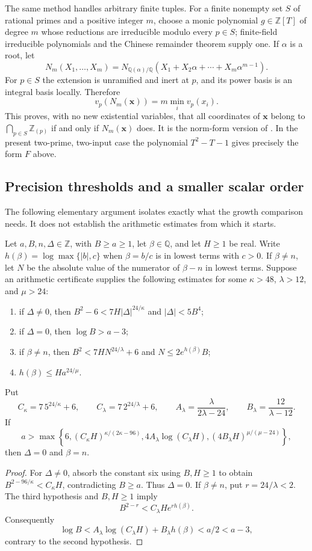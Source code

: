 The same method handles arbitrary finite tuples. For a finite nonempty
set $S$ of rational primes and a positive integer $m$, choose a monic
polynomial $g\in\mathbb Z[T]$ of degree $m$ whose reductions are
irreducible modulo every $p\in S$; finite-field irreducible polynomials
and the Chinese remainder theorem supply one. If $\alpha$ is a root, let
\[
 N_m(X_1,\ldots,X_m)=
 N_{\mathbb Q(\alpha)/\mathbb Q}
 (X_1+X_2\alpha+\cdots+X_m\alpha^{m-1}).
\]
For $p\in S$ the extension is unramified and inert at $p$, and its
power basis is an integral basis locally. Therefore
\[
 v_p(N_m(\mathbf x))=m\min_i v_p(x_i).
\]
This proves, with no new existential variables, that all coordinates of
$\mathbf x$ belong to $\bigcap_{p\in S}\mathbb Z_{(p)}$ if and only if
$N_m(\mathbf x)$ does. It is the norm-form version of
\cite[Proposition 4.8]{Daans2024}. In the present two-prime, two-input
case the polynomial $T^2-T-1$ gives precisely the form $F$ above.

\subsection{Precision thresholds and a smaller scalar order}

The following elementary argument isolates exactly what the growth
comparison needs. It does not establish the arithmetic estimates from
which it starts.

\begin{proposition}\label{prop:precision-thresholds}
Let $a,B,n,\Delta\in\mathbb Z$, with $B\ge a\ge1$, let
$\beta\in\mathbb Q$, and let $H\ge1$ be real.
Write $h(\beta)=\log\max\{|b|,c\}$ when $\beta=b/c$ is in lowest
terms with $c>0$. If $\beta\ne n$, let $N$ be the absolute value
of the numerator of $\beta-n$ in lowest terms.
Suppose an arithmetic certificate supplies the following estimates
for some $\kappa>48$,
$\lambda>12$, and $\mu>24$:
\begin{enumerate}
\item if $\Delta\ne0$, then
$B^2-6<7H|\Delta|^{24/\kappa}$ and $|\Delta|<5B^4$;
\item if $\Delta=0$, then $\log B>a-3$;
\item if $\beta\ne n$, then
$B^2<7HN^{24/\lambda}+6$ and $N\le2e^{h(\beta)}B$;
\item $h(\beta)\le H a^{24/\mu}$.
\end{enumerate}
Put
\[
 C_\kappa=7\,5^{24/\kappa}+6,\qquad
 C_\lambda=7\,2^{24/\lambda}+6,\qquad
 A_\lambda=\frac{\lambda}{2\lambda-24},\qquad
 B_\lambda=\frac{12}{\lambda-12}.
\]
If
\[
 a>\max\left\{6,
 (C_\kappa H)^{\kappa/(2\kappa-96)},
 4A_\lambda\log(C_\lambda H),
 (4B_\lambda H)^{\mu/(\mu-24)}\right\},
\]
then $\Delta=0$ and $\beta=n$.
\end{proposition}
\begin{proof}
For $\Delta\ne0$, absorb the constant six using $B,H\ge1$ to obtain
$B^{2-96/\kappa}<C_\kappa H$, contradicting $B\ge a$.
Thus $\Delta=0$. If $\beta\ne n$, put $r=24/\lambda<2$.
The third hypothesis and $B,H\ge1$ imply
\[
 B^{2-r}<C_\lambda H e^{r h(\beta)}.
\]
Consequently
\[
 \log B<A_\lambda\log(C_\lambda H)+B_\lambda h(\beta)<a/2<a-3,
\]
contrary to the second hypothesis.
\end{proof}

